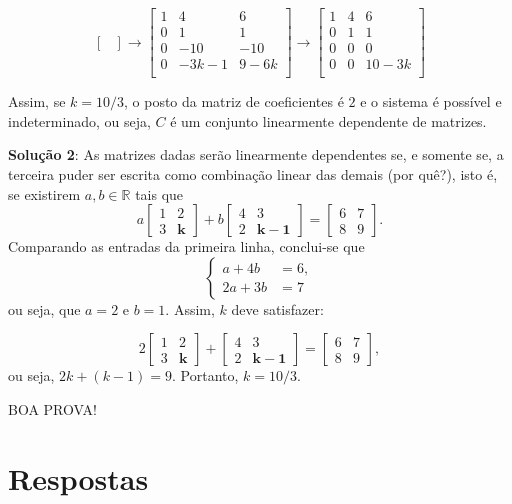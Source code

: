 \documentclass[12pt,a4paper]{article}
\newcommand*\R{\mathbb{R}}
\begin{document}
\begin{ExerciseList}
\[\begin{bmatrix}
\end{bmatrix}
\rightarrow
\begin{bmatrix}
1 & 4 & 6\\
0 & 1 & 1\\
0 & -10 & -10\\
0 & -3k-1 & 9-6k\\
\end{bmatrix}
\rightarrow
\begin{bmatrix}
1 & 4 & 6\\
0 & 1 & 1\\
0 & 0 & 0\\
0 & 0 & 10-3k\\
\end{bmatrix}
\]

Assim, se $k=10/3$, o posto da matriz de coeficientes é $2$ e o sistema é possível e indeterminado, ou seja, $C$ é um conjunto linearmente dependente de matrizes.

\textbf{Solução 2}: As matrizes dadas serão linearmente dependentes se, e somente se, a terceira puder ser escrita como combinação linear das demais (por quê?), isto é, se existirem $a,b \in \R$ tais que
\[
a
\begin{bmatrix}
1 & 2 \\ 3 & \mathbf{k}
\end{bmatrix}
+b
\begin{bmatrix}
4 & 3 \\ 2 & \mathbf{k-1}
\end{bmatrix}
=
\begin{bmatrix}
6 & 7 \\ 8 & 9
\end{bmatrix}.
\]
Comparando as entradas da primeira linha, conclui-se que
\[
\begin{cases}
a +4b &=6,\\
2a+3b &=7
\end{cases}
\]
ou seja, que $a = 2$ e $b = 1$. Assim, $k$ deve satisfazer:

\[
2
\begin{bmatrix}
1 & 2 \\ 3 & \mathbf{k}
\end{bmatrix}
+
\begin{bmatrix}
4 & 3 \\ 2 & \mathbf{k-1}
\end{bmatrix}
=
\begin{bmatrix}
6 & 7 \\ 8 & 9
\end{bmatrix},
\]
ou seja, $2k + (k-1) = 9$. Portanto, $k = 10/3$.
\end{ExerciseList}

\begin{center}
BOA PROVA!
\end{center}

\newpage
\restoregeometry
\section*{Respostas}
\shipoutAnswer
\end{document}
